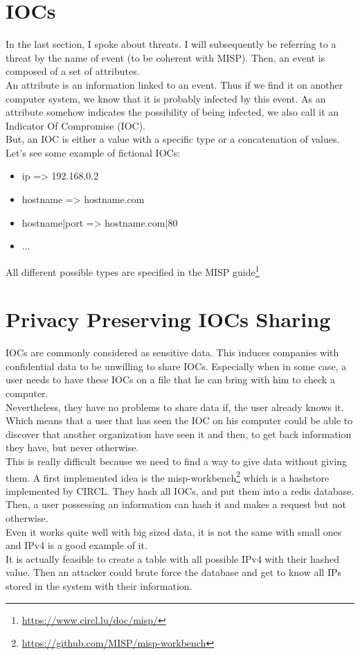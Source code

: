 \documentclass[10pt]{article}
\begin{document}
\section{IOCs}
In the last section, I spoke about threats. I will subsequently be referring to a threat by the name of event (to be coherent with MISP). Then, an event is composed of a set of attributes. \\
An attribute is an information linked to an event. Thus if we find it on another computer system, we know that it is probably infected by this event. As an attribute somehow indicates the possibility of being infected, we also call it an Indicator Of Compromise (IOC).\\
But, an IOC is either a value with a specific type or a concatenation of values. Let's see some example of fictional IOCs:
\begin{itemize}
\item ip => 192.168.0.2
\item hostname => hostname.com
\item hostname|port => hostname.com|80
\item ...
\end{itemize} 
All different possible types are specified in the MISP guide\footnote{\url{https://www.circl.lu/doc/misp/}}

\section{Privacy Preserving IOCs Sharing}
IOCs are commonly considered as sensitive data. This induces companies with confidential data to be unwilling to share IOCs. Especially when in some case, a user needs to have these IOCs on a file that he can bring with him to check a computer.\\
Nevertheless, they have no problems to share data if, the user already knows it. Which means that a user that has seen the IOC on his computer could be able to discover that another organization have seen it and then, to get back information they have, but never otherwise.\\

This is really difficult because we need to find a way to give data without giving them. A first implemented idea is the misp-workbench\footnote{\url{https://github.com/MISP/misp-workbench}} which is a hashstore implemented by CIRCL. They hash all IOCs, and put them into a redis database.\\
Then, a user possessing an information can hash it and makes a request but not otherwise.\\
Even it works quite well with big sized data, it is not the same with small ones and IPv4 is a good example of it.\\
It is actually feasible to create a table with all possible IPv4 with their hashed value. Then an attacker could brute force the database and get to know all IPs stored in the system with their information.\\
\end{document}

